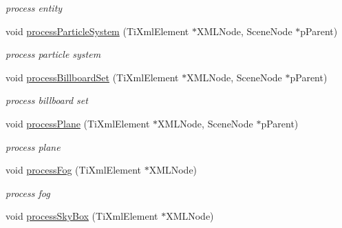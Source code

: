 \begin{DoxyCompactItemize}
\begin{DoxyCompactList}\small\item\em process entity \end{DoxyCompactList}\item 
void \hyperlink{class_ogre_1_1_dot_scene_loader_a4aac1d9bbefcd0026a2f21005d587fe0}{process\+Particle\+System} (Ti\+Xml\+Element $\ast$X\+M\+L\+Node, Scene\+Node $\ast$p\+Parent)\hypertarget{class_ogre_1_1_dot_scene_loader_a4aac1d9bbefcd0026a2f21005d587fe0}{}\label{class_ogre_1_1_dot_scene_loader_a4aac1d9bbefcd0026a2f21005d587fe0}

\begin{DoxyCompactList}\small\item\em process particle system \end{DoxyCompactList}\item 
void \hyperlink{class_ogre_1_1_dot_scene_loader_a9b7c7ccd8f2724eb44dc9428ba6cb0d7}{process\+Billboard\+Set} (Ti\+Xml\+Element $\ast$X\+M\+L\+Node, Scene\+Node $\ast$p\+Parent)
\begin{DoxyCompactList}\small\item\em process billboard set \end{DoxyCompactList}\item 
void \hyperlink{class_ogre_1_1_dot_scene_loader_a8131406550814512ea64907b598b3f1c}{process\+Plane} (Ti\+Xml\+Element $\ast$X\+M\+L\+Node, Scene\+Node $\ast$p\+Parent)
\begin{DoxyCompactList}\small\item\em process plane \end{DoxyCompactList}\item 
void \hyperlink{class_ogre_1_1_dot_scene_loader_ac6f536ff0e073cf1d684027577561fb7}{process\+Fog} (Ti\+Xml\+Element $\ast$X\+M\+L\+Node)\hypertarget{class_ogre_1_1_dot_scene_loader_ac6f536ff0e073cf1d684027577561fb7}{}\label{class_ogre_1_1_dot_scene_loader_ac6f536ff0e073cf1d684027577561fb7}

\begin{DoxyCompactList}\small\item\em process fog \end{DoxyCompactList}\item 
void \hyperlink{class_ogre_1_1_dot_scene_loader_ab862c3347cbb0dfe2063afb2a382399f}{process\+Sky\+Box} (Ti\+Xml\+Element $\ast$X\+M\+L\+Node)\hypertarget{class_ogre_1_1_dot_scene_loader_ab862c3347cbb0dfe2063afb2a382399f}{}\label{class_ogre_1_1_dot_scene_loader_ab862c3347cbb0dfe2063afb2a382399f}


\end{DoxyCompactItemize}

